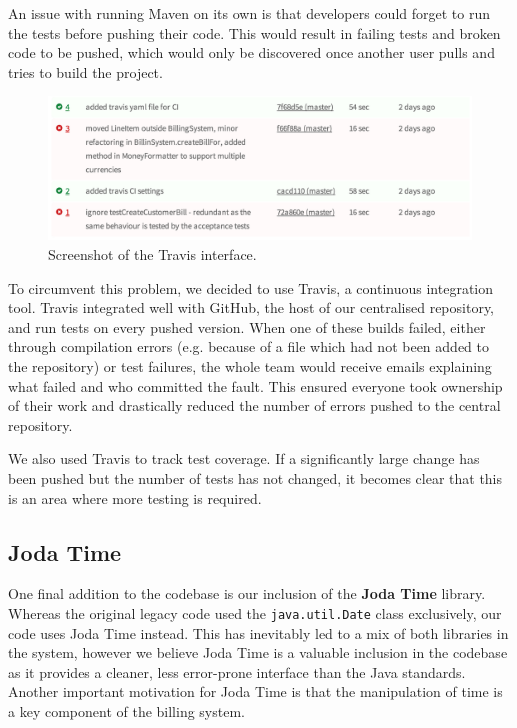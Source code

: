 \documentclass[a4paper]{article}
\begin{document}
An issue with running Maven on its own is that developers could forget to run the tests before pushing their code. This would result in failing tests and broken code to be pushed, which would only be discovered once another user pulls and tries to build the project.
\begin{figure}[H]
	\centering
		\includegraphics[scale=0.55]{travis}
	\caption{Screenshot of the Travis interface.}
\end{figure}

To circumvent this problem, we decided to use Travis, a continuous integration tool. Travis integrated well with GitHub, the host of our centralised repository, and run tests on every pushed version. When one of these builds failed, either through compilation errors (e.g. because of a file which had not been added to the repository) or test failures, the whole team would receive emails explaining what failed and who committed the fault. This ensured everyone took ownership of their work and drastically reduced the number of errors pushed to the central repository. 

We also used Travis to track test coverage. If a significantly large change has been pushed but the number of tests has not changed, it becomes clear that this is an area where more testing is required.

\subsection{Joda Time}

One final addition to the codebase is our inclusion of the {\bf Joda Time} library. Whereas the original legacy code used the \verb+java.util.Date+ class exclusively, our code uses Joda Time instead. This has inevitably led to a mix of both libraries in the system, however we believe Joda Time is a valuable inclusion in the codebase as it provides a cleaner, less error-prone interface than the Java standards. Another important motivation for Joda Time is that the manipulation of time is a key component of the billing system. 
\end{document}
